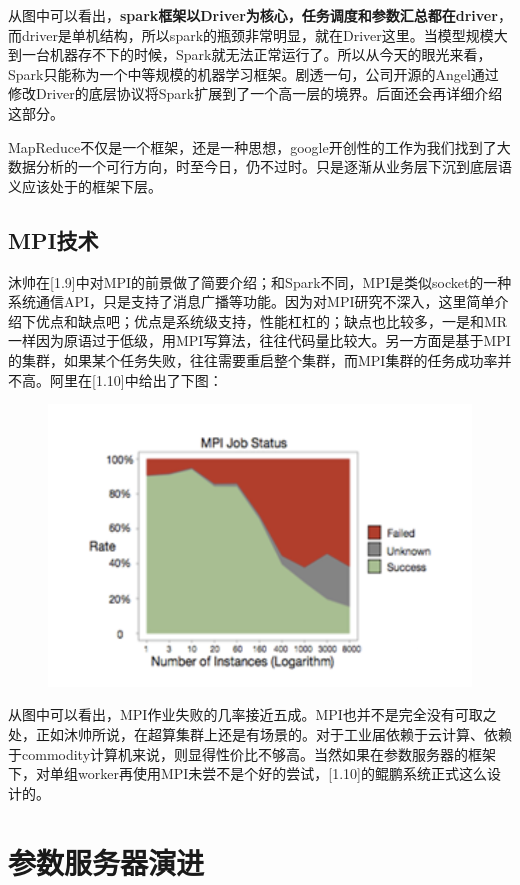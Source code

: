 \documentclass[12pt]{article}
\begin{document}
从图中可以看出，\textbf{spark框架以Driver为核心，任务调度和参数汇总都在driver}，而driver是单机结构，所以spark的瓶颈非常明显，就在Driver这里。当模型规模大到一台机器存不下的时候，Spark就无法正常运行了。所以从今天的眼光来看，Spark只能称为一个中等规模的机器学习框架。剧透一句，公司开源的Angel通过修改Driver的底层协议将Spark扩展到了一个高一层的境界。后面还会再详细介绍这部分。

MapReduce不仅是一个框架，还是一种思想，google开创性的工作为我们找到了大数据分析的一个可行方向，时至今日，仍不过时。只是逐渐从业务层下沉到底层语义应该处于的框架下层。

\subsection{MPI技术}
沐帅在[1.9]中对MPI的前景做了简要介绍；和Spark不同，MPI是类似socket的一种系统通信API，只是支持了消息广播等功能。因为对MPI研究不深入，这里简单介绍下优点和缺点吧；优点是系统级支持，性能杠杠的；缺点也比较多，一是和MR一样因为原语过于低级，用MPI写算法，往往代码量比较大。另一方面是基于MPI的集群，如果某个任务失败，往往需要重启整个集群，而MPI集群的任务成功率并不高。阿里在[1.10]中给出了下图：
\begin{figure}[H]
    \centering
    \includegraphics[width=.5\textwidth]{fig/Large_Scale_MPI.png}
\end{figure}
从图中可以看出，MPI作业失败的几率接近五成。MPI也并不是完全没有可取之处，正如沐帅所说，在超算集群上还是有场景的。对于工业届依赖于云计算、依赖于commodity计算机来说，则显得性价比不够高。当然如果在参数服务器的框架下，对单组worker再使用MPI未尝不是个好的尝试，[1.10]的鲲鹏系统正式这么设计的。

\section{参数服务器演进}
\end{document}
